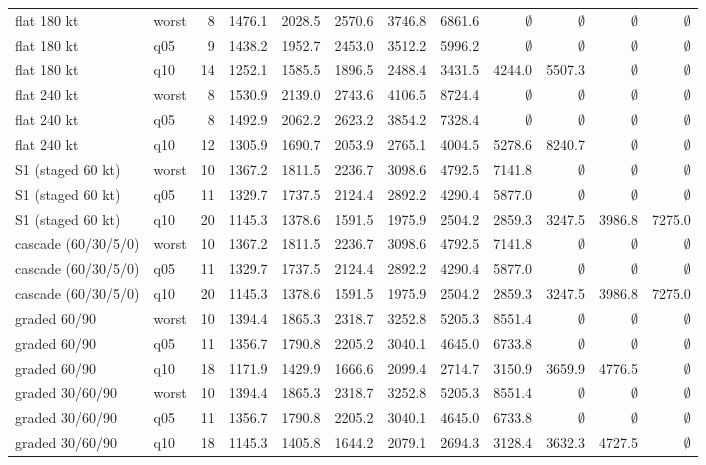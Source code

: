 \begin{longtable}{llrrrrrrrrrr}
flat 180 kt & worst & 8 & 1476.1 & 2028.5 & 2570.6 & 3746.8 & 6861.6 & $\emptyset$ & $\emptyset$ & $\emptyset$ & $\emptyset$ \\
flat 180 kt & q05 & 9 & 1438.2 & 1952.7 & 2453.0 & 3512.2 & 5996.2 & $\emptyset$ & $\emptyset$ & $\emptyset$ & $\emptyset$ \\
flat 180 kt & q10 & 14 & 1252.1 & 1585.5 & 1896.5 & 2488.4 & 3431.5 & 4244.0 & 5507.3 & $\emptyset$ & $\emptyset$ \\
flat 240 kt & worst & 8 & 1530.9 & 2139.0 & 2743.6 & 4106.5 & 8724.4 & $\emptyset$ & $\emptyset$ & $\emptyset$ & $\emptyset$ \\
flat 240 kt & q05 & 8 & 1492.9 & 2062.2 & 2623.2 & 3854.2 & 7328.4 & $\emptyset$ & $\emptyset$ & $\emptyset$ & $\emptyset$ \\
flat 240 kt & q10 & 12 & 1305.9 & 1690.7 & 2053.9 & 2765.1 & 4004.5 & 5278.6 & 8240.7 & $\emptyset$ & $\emptyset$ \\
S1 (staged 60 kt) & worst & 10 & 1367.2 & 1811.5 & 2236.7 & 3098.6 & 4792.5 & 7141.8 & $\emptyset$ & $\emptyset$ & $\emptyset$ \\
S1 (staged 60 kt) & q05 & 11 & 1329.7 & 1737.5 & 2124.4 & 2892.2 & 4290.4 & 5877.0 & $\emptyset$ & $\emptyset$ & $\emptyset$ \\
S1 (staged 60 kt) & q10 & 20 & 1145.3 & 1378.6 & 1591.5 & 1975.9 & 2504.2 & 2859.3 & 3247.5 & 3986.8 & 7275.0 \\
cascade (60/30/5/0) & worst & 10 & 1367.2 & 1811.5 & 2236.7 & 3098.6 & 4792.5 & 7141.8 & $\emptyset$ & $\emptyset$ & $\emptyset$ \\
cascade (60/30/5/0) & q05 & 11 & 1329.7 & 1737.5 & 2124.4 & 2892.2 & 4290.4 & 5877.0 & $\emptyset$ & $\emptyset$ & $\emptyset$ \\
cascade (60/30/5/0) & q10 & 20 & 1145.3 & 1378.6 & 1591.5 & 1975.9 & 2504.2 & 2859.3 & 3247.5 & 3986.8 & 7275.0 \\
graded 60/90 & worst & 10 & 1394.4 & 1865.3 & 2318.7 & 3252.8 & 5205.3 & 8551.4 & $\emptyset$ & $\emptyset$ & $\emptyset$ \\
graded 60/90 & q05 & 11 & 1356.7 & 1790.8 & 2205.2 & 3040.1 & 4645.0 & 6733.8 & $\emptyset$ & $\emptyset$ & $\emptyset$ \\
graded 60/90 & q10 & 18 & 1171.9 & 1429.9 & 1666.6 & 2099.4 & 2714.7 & 3150.9 & 3659.9 & 4776.5 & $\emptyset$ \\
graded 30/60/90 & worst & 10 & 1394.4 & 1865.3 & 2318.7 & 3252.8 & 5205.3 & 8551.4 & $\emptyset$ & $\emptyset$ & $\emptyset$ \\
graded 30/60/90 & q05 & 11 & 1356.7 & 1790.8 & 2205.2 & 3040.1 & 4645.0 & 6733.8 & $\emptyset$ & $\emptyset$ & $\emptyset$ \\
graded 30/60/90 & q10 & 18 & 1145.3 & 1405.8 & 1644.2 & 2079.1 & 2694.3 & 3128.4 & 3632.3 & 4727.5 & $\emptyset$ \\
\end{longtable}
\endgroup
